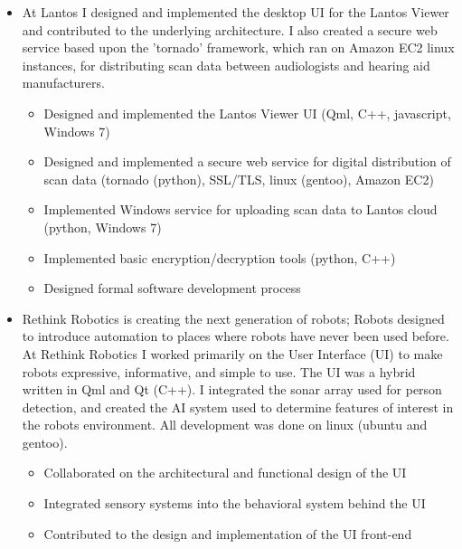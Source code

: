 \documentclass[11pt,a4paper,sans]{moderncv}        %
\begin{document}
\begin{itemize}

  \item{}

    At Lantos I designed and implemented the desktop UI for the Lantos Viewer
    and contributed to the underlying architecture. I also created a secure web
    service based upon the 'tornado' framework, which ran on Amazon EC2 linux
    instances, for distributing scan data between audiologists and hearing aid
    manufacturers.

    \begin{itemize}
      \item{Designed and implemented the Lantos Viewer UI (Qml, C++, javascript, Windows 7)}
      \item{Designed and implemented a secure web service for digital distribution of scan data (tornado (python), SSL/TLS, linux (gentoo), Amazon EC2)}
      \item{Implemented Windows service for uploading scan data to Lantos cloud (python, Windows 7)}
      \item{Implemented basic encryption/decryption tools (python, C++)}
      \item{Designed formal software development process}
    \end{itemize}

\end{itemize}


\vspace{6pt}

\begin{itemize}

  \item{}

    Rethink Robotics is creating the next generation of robots; Robots designed
    to introduce automation to places where robots have never been used before.
    At Rethink Robotics I worked primarily on the User Interface (UI) to make
    robots expressive, informative, and simple to use. The UI was a hybrid
    written in Qml and Qt (C++). I integrated the sonar array used for person
    detection, and created the AI system used to determine features of interest
    in the robots environment. All development was done on linux (ubuntu and
    gentoo).

    \begin{itemize}
      \item{Collaborated on the architectural and functional design of the UI}
      \item{Integrated sensory systems into the behavioral system behind the UI}
      \item{Contributed to the design and implementation of the UI front-end}
    \end{itemize}

\end{itemize}
\end{document}
